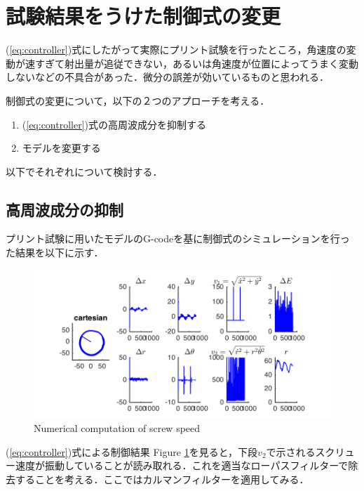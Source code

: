 \documentclass[twocolumn,oneside,a4paper]{article}
\begin{document}
\section{試験結果をうけた制御式の変更}
(\ref{eq:controller})式にしたがって実際にプリント試験を行ったところ，角速度の変動が速すぎて射出量が追従できない，あるいは角速度が位置によってうまく変動しないなどの不具合があった．微分の誤差が効いているものと思われる．

制御式の変更について，以下の２つのアプローチを考える．

\begin{enumerate}
	\item (\ref{eq:controller})式の高周波成分を抑制する
	\item モデルを変更する
\end{enumerate}

以下でそれぞれについて検討する．
\subsection{高周波成分の抑制}
プリント試験に用いたモデルのG-codeを基に制御式のシミュレーションを行った結果を以下に示す．

\begin{figure}[htbp]
    \includegraphics[bb=0 0 432 216,width=1\columnwidth]{gcodesim.png}
    \caption{Numerical computation of screw speed}
    \label{fig:noise}
\end{figure}

(\ref{eq:controller})式による制御結果
Figure \ref{fig:noise}を見ると，下段$v_2$で示されるスクリュー速度が振動していることが読み取れる．これを適当なローパスフィルターで除去することを考える．ここではカルマンフィルターを適用してみる．
\end{document}

